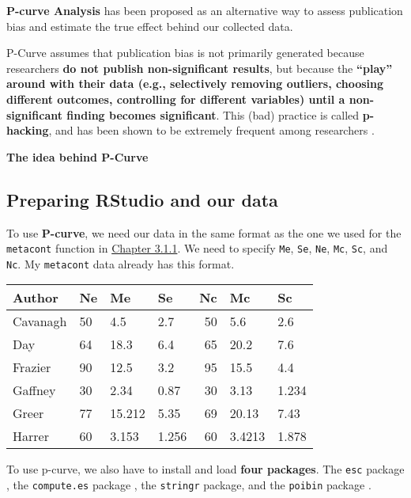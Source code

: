 \documentclass[]{book}
\theoremstyle{definition}
\theoremstyle{definition}
\theoremstyle{definition}
\theoremstyle{remark}
\begin{document}
\textbf{P-curve Analysis} has been proposed as an alternative way to
assess publication bias and estimate the true effect behind our
collected data.

P-Curve assumes that publication bias is not primarily generated because
researchers \textbf{do not publish non-significant results}, but because
the \textbf{``play'' around with their data (e.g., selectively removing
outliers, choosing different outcomes, controlling for different
variables) until a non-significant finding becomes significant}. This
(bad) practice is called \textbf{p-hacking}, and has been shown to be
extremely frequent among researchers \citep{head2015extent}.

\begin{rmdinfo}
\textbf{The idea behind P-Curve}
\end{rmdinfo}

\subsection{Preparing RStudio and our
data}\label{preparing-rstudio-and-our-data}

To use \textbf{P-curve}, we need our data in the same format as the one
we used for the \texttt{metacont} function in
\protect\hyperlink{excel_preparation}{Chapter 3.1.1}. We need to specify
\texttt{Me}, \texttt{Se}, \texttt{Ne}, \texttt{Mc}, \texttt{Sc}, and
\texttt{Nc}. My \texttt{metacont} data already has this format.

\begin{tabular}{l|l|l|l|r|l|l}
\hline
Author & Ne & Me & Se & Nc & Mc & Sc\\
\hline
Cavanagh & 50 & 4.5 & 2.7 & 50 & 5.6 & 2.6\\
\hline
Day & 64 & 18.3 & 6.4 & 65 & 20.2 & 7.6\\
\hline
Frazier & 90 & 12.5 & 3.2 & 95 & 15.5 & 4.4\\
\hline
Gaffney & 30 & 2.34 & 0.87 & 30 & 3.13 & 1.234\\
\hline
Greer & 77 & 15.212 & 5.35 & 69 & 20.13 & 7.43\\
\hline
Harrer & 60 & 3.153 & 1.256 & 60 & 3.4213 & 1.878\\
\hline
\end{tabular}

To use p-curve, we also have to install and load \textbf{four packages}.
The \texttt{esc} package \citep{esc}, the \texttt{compute.es} package
\citep{del2013compute}, the \texttt{stringr} package, and the
\texttt{poibin} package \citep{hong2011poibin}.
\end{document}
